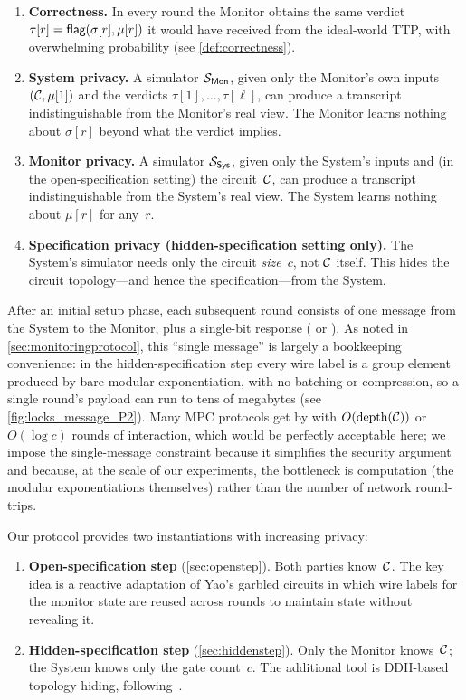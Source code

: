 \begin{enumerate}
    \item \textbf{Correctness.} In every round the Monitor obtains the same verdict $\tau[r] = \textsf{flag}(\sigma[r],\mu[r])$ it would have received from the ideal-world TTP, with overwhelming probability (see \cref{def:correctness}).
    \item \textbf{System privacy.} A simulator $\mathcal{S}_{\textsf{Mon}}$, given only the Monitor's own inputs $(\mathcal{C},\mu[1])$ and the verdicts $\tau[1],\ldots,\tau[\ell]$, can produce a transcript indistinguishable from the Monitor's real view. The Monitor learns nothing about $\sigma[r]$ beyond what the verdict implies.
    \item \textbf{Monitor privacy.} A simulator $\mathcal{S}_{\textsf{Sys}}$, given only the System's inputs and (in the open-specification setting) the circuit~$\mathcal{C}$, can produce a transcript indistinguishable from the System's real view. The System learns nothing about $\mu[r]$ for any~$r$.
    \item \textbf{Specification privacy (hidden-specification setting only).} The System's simulator needs only the circuit \emph{size}~$c$, not $\mathcal{C}$ itself. This hides the circuit topology---and hence the specification---from the System.
\end{enumerate}

\noindent After an initial setup phase, each subsequent round consists of one message from the System to the Monitor, plus a single-bit response (\proceed{} or \terminate{}).  As noted in \cref{sec:monitoringprotocol}, this ``single message'' is largely a bookkeeping convenience: in the hidden-specification step every wire label is a group element produced by bare modular exponentiation, with no batching or compression, so a single round's payload can run to tens of megabytes (see \cref{fig:locks_message_P2}).  Many MPC protocols get by with $O(\text{depth}(\mathcal{C}))$ or $O(\log c)$ rounds of interaction, which would be perfectly acceptable here; we impose the single-message constraint because it simplifies the security argument and because, at the scale of our experiments, the bottleneck is computation (the modular exponentiations themselves) rather than the number of network round-trips.

Our protocol provides two instantiations with increasing privacy:

\begin{enumerate}
    \item \textbf{Open-specification step} (\cref{sec:openstep}). Both parties know~$\mathcal{C}$. The key idea is a reactive adaptation of Yao's garbled circuits in which wire labels for the monitor state are reused across rounds to maintain state without revealing it.
    \item \textbf{Hidden-specification step} (\cref{sec:hiddenstep}). Only the Monitor knows~$\mathcal{C}$; the System knows only the gate count~$c$. The additional tool is DDH-based topology hiding, following~\cite{LWY22}.
\end{enumerate}

